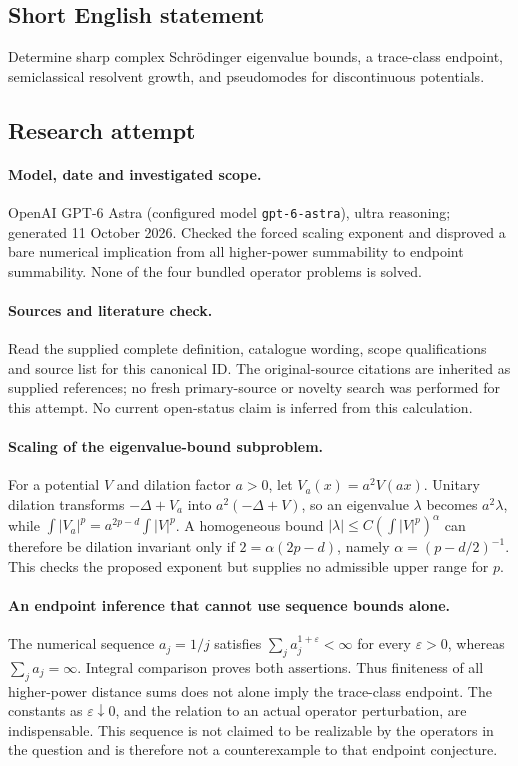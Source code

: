 \documentclass[11pt]{article}
\begin{document}
\subsection{Short English statement}
Determine sharp complex Schrödinger eigenvalue bounds, a trace-class endpoint, semiclassical resolvent growth, and pseudomodes for discontinuous potentials.
\subsection{Research attempt}
\paragraph{Model, date and investigated scope.}
OpenAI GPT-6 Astra (configured model \texttt{gpt-6-astra}), ultra reasoning; generated 11 October 2026. Checked the forced scaling exponent and disproved a bare numerical implication from all higher-power summability to endpoint summability. None of the four bundled operator problems is solved.

\paragraph{Sources and literature check.}
Read the supplied complete definition, catalogue wording, scope qualifications and source list for this canonical ID. The original-source citations are inherited as supplied references; no fresh primary-source or novelty search was performed for this attempt. No current open-status claim is inferred from this calculation.

\paragraph{Scaling of the eigenvalue-bound subproblem.}For a potential \(V\) and dilation factor \(a>0\), let \(V_a(x)=a^2V(ax)\). Unitary dilation transforms \(-\Delta+V_a\) into \(a^2(-\Delta+V)\), so an eigenvalue \(\lambda\) becomes \(a^2\lambda\), while \(\int|V_a|^p=a^{2p-d}\int|V|^p\). A homogeneous bound \(|\lambda|\le C(\int|V|^p)^\alpha\) can therefore be dilation invariant only if \(2=\alpha(2p-d)\), namely \(\alpha=(p-d/2)^{-1}\). This checks the proposed exponent but supplies no admissible upper range for \(p\).
\paragraph{An endpoint inference that cannot use sequence bounds alone.}The numerical sequence \(a_j=1/j\) satisfies \(\sum_ja_j^{1+\varepsilon}<\infty\) for every \(\varepsilon>0\), whereas \(\sum_ja_j=\infty\). Integral comparison proves both assertions. Thus finiteness of all higher-power distance sums does not alone imply the trace-class endpoint. The constants as \(\varepsilon\downarrow0\), and the relation to an actual operator perturbation, are indispensable. This sequence is not claimed to be realizable by the operators in the question and is therefore not a counterexample to that endpoint conjecture.
\end{document}
